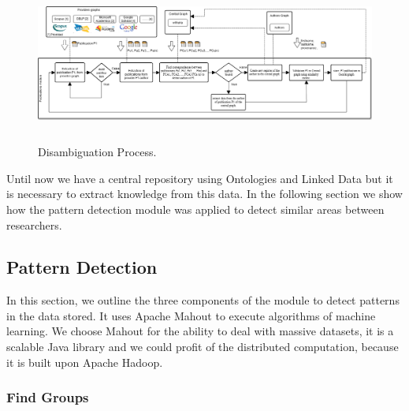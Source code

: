 \documentclass[11pt]{article}
\begin{document}
\begin{figure}[ht!]
	\centering
		\includegraphics[height=5.2cm]{desambiguationProcess.png}
	\caption{Disambiguation Process.}
	\label{fig:DisambiguationProcess}
\end{figure}

Until now we have a central repository using Ontologies and Linked Data but it is necessary to extract knowledge from this data. In the following section we show how the pattern detection module was applied to detect similar areas between researchers. 
  
\subsection{Pattern Detection}
\label{label:detectsimilarareas}

In this section, we outline the three components of the module to detect patterns in the data stored. It uses Apache Mahout to execute algorithms of machine learning. We choose Mahout for the ability to deal with massive datasets, it is a scalable Java library and we could profit of the distributed computation, because it is built upon Apache Hadoop. %


\subsubsection{Find Groups}
\label{label:discoversimareas}
\end{document}
